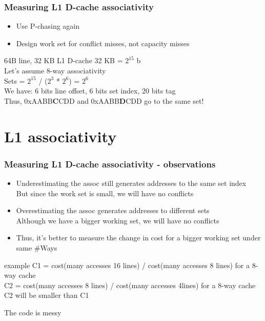 \documentclass{beamer}
\begin{document}
\begin{frame}
\frametitle{Measuring L1 D-cache associativity}
\begin{itemize}
\item Use P-chasing again
\item Design work set for conflict misses, not capacity misses
\end{itemize}

\begin{block}{64B line, 32 KB L1 D-cache}
32 KB = $2^{15}$ b\\
Let's assume 8-way associativity\\
Sets = $2^{15}$ / ($2^{3}$ * $2^6$) = $2^6$\\
We have: 6 bits line offset, 6 bits set index, 20 bits tag\\
Thus, 0xAABB\textbf{C}CDD and 0xAABB\textbf{D}CDD go to the same set!
\end{block}
\end{frame}

\section{L1 associativity}

\begin{frame}
\frametitle{Measuring L1 D-cache associativity - observations}
\begin{itemize}
\item Underestimating the assoc still generates addresses to the same set index\\
But since the work set is small, we will have no conflicts
\item Overestimating the assoc generates addresses to different sets\\
Although we have a bigger working set, we will have no conflicts
\item Thus, it's better to measure the change in cost for a bigger working set under same \#Ways\\
\end{itemize}
\begin{block}{example}
C1 = cost(many accesses 16 lines) / cost(many accesses 8 lines) for a 8-way cache\\
C2 = cost(many accesses 8 lines) / cost(many accesses 4lines) for a 8-way cache\\
C2 will be smaller than C1
\end{block}
The code is messy
\end{frame}
\end{document}
